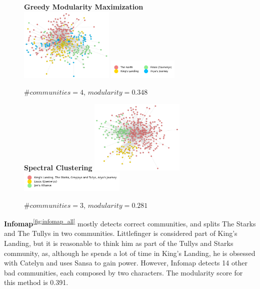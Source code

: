 \documentclass[10pt,twocolumn,letterpaper]{article}
\begin{document}
\begin{figure}[!h]
    \centering
    \textbf{Greedy Modularity Maximization}\\
    \includegraphics[width=0.4\textwidth]{img/all_seasons/communities_gmm.jpg}
    \includegraphics[width=0.3\textwidth]{img/all_seasons/gmm_legend.jpg}\\
    \caption{\small{$\#communities=4$, $modularity=0.348$}}
    \label{fig:gmm_all}
\end{figure}

\begin{figure}[!h]
    \centering
    \textbf{Spectral Clustering}
    \includegraphics[width=0.4\textwidth]{img/all_seasons/communities_sc.jpg}
    \includegraphics[width=0.45\textwidth]{img/all_seasons/sc_legend.jpg}\\
    \caption{\small{$\#communities=3$, $modularity=0.281$}}
    \label{fig:sc_all}
\end{figure}


\textbf{Infomap}\textsuperscript{\ref{fig:infomap_all}} mostly detects correct communities, and splits The Starks and The Tullys in two communities. Littlefinger is considered part of King's Landing, but it is reasonable to think him as part of the Tullys and Starks community, as, although he spends a lot of time in King's Landing, he is obsessed with Catelyn and uses Sansa to gain power. However, Infomap detects 14 other bad communities, each composed by two characters. The modularity score for this method is 0.391.\\
\end{document}
